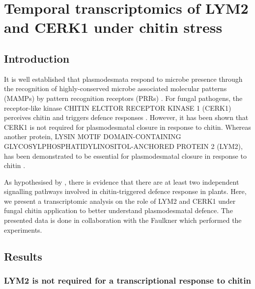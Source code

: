 \documentclass[../main.tex]{subfiles}
\begin{document}
\chapter{Temporal transcriptomics of LYM2 and CERK1 under chitin stress}
\label{cha:transcripts}

\section{Introduction}
It is well established that plasmodesmata respond to microbe presence
through the recognition of highly-conserved microbe associated
molecular patterns (MAMPs) by pattern recognition receptors (PRRs)
\cite{chevalPlasmodesmalRegulationPlant2018,
  zipfelPlantPatternrecognitionReceptors2014,
  lunaCalloseDepositionMultifaceted2010}. For fungal pathogens, the
receptor-like kinase CHITIN ELCITOR RECEPTOR KINASE 1 (CERK1)
perceives chitin and triggers defence responses
\cite{miyaCERK1LysMReceptor2007}. However, it has been shown that
CERK1 is not required for plasmodesmatal closure in response to
chitin. Whereas another protein, LYSIN MOTIF DOMAIN-CONTAINING
GLYCOSYLPHOSPHATIDYLINOSITOL-ANCHORED PROTEIN 2 (LYM2), has been
demonstrated to be essential for plasmodesmatal closure in response to chitin
\cite{Faulkner2013}.


As hypothesised by \citet{Faulkner2013}, there is evidence that there are at least two
independent signalling pathways involved in chitin-triggered defence response in
plants. Here, we present a transcriptomic analysis on the role of LYM2 and CERK1
under fungal chitin application to better understand plasmodesmatal defence. The
presented data is done in collaboration with the Faulkner which performed the
experiments.

\section{Results}

\subsection{LYM2 is not required for a transcriptional response to chitin}

\end{document}
